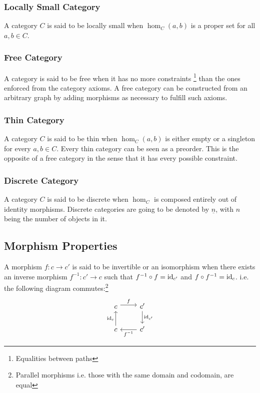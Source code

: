 \subsubsection*{Locally Small Category}
A category $C$ is said to be locally small when $\hom_C(a, b)$ is a
proper set for all $a,b\in C$. \parencite{awodey:category_theory}

\subsubsection*{Free Category}
A category is said to be free when it has no more constraints
\footnote{Equalities between paths} than the ones enforced from the category
axioms. \parencite{adamek_herrlich_strecker:joy_cats} A free category can be
constructed from an arbitrary graph by adding morphisms as necessary to fulfill
such axioms.

\subsubsection*{Thin Category}
A category $C$ is said to be thin when $\hom_C(a, b)$ is either empty or
a singleton for every $a,b\in C$. \parencite{adamek_herrlich_strecker:joy_cats}
Every thin category can be seen as a preorder. This is the opposite of a free
category in the sense that it has every possible constraint.

\subsubsection*{Discrete Category}
A category $C$ is said to be discrete when $\hom_C$ is composed entirely
out of identity morphisms. \parencite{awodey:category_theory} Discrete
categories are going to be denoted by $\underline{n}$, with $n$ being the number
of objects in it.

\subsection{Morphism Properties}

\begin{definition}[Isomorphism]
  A morphism $f: c\to c'$ is said to be invertible or an isomorphism when there
  exists an inverse morphism $f^{-1}:c'\to c$ such that $f^{-1}\circ f =
  \mathrm{id}_{c'}$ and $f\circ f^{-1} = \mathrm{id}_c$.
  \parencite{maclane:working_mathematician} i.e. the following diagram
  commutes:\footnote{Parallel morphisms i.e. those with the same domain and
  codomain, are equal}
  \[\begin{tikzcd}
    c & {c'} \\
    c & {c'}
    \arrow["f", shift left=1, from=1-1, to=1-2]
    \arrow["{f^{-1}}", from=2-2, to=2-1]
    \arrow["{\mathrm{id}_c}", from=2-1, to=1-1]
    \arrow["{\mathrm{id}_{c'}}", from=1-2, to=2-2]
  \end{tikzcd}\]
\end{definition}

